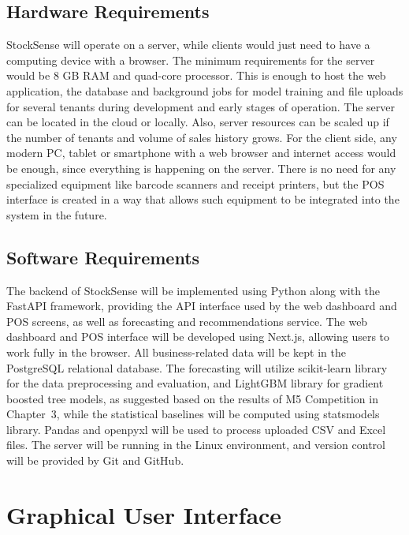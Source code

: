 \documentclass{StockSense}
\begin{document}
\subsection{Hardware Requirements}

StockSense will operate on a server, while clients would just need to have a computing device with a browser. The minimum requirements for the server would be 8 GB RAM and quad-core processor. This is enough to host the web application, the database and background jobs for model training and file uploads for several tenants during development and early stages of operation. The server can be located in the cloud or locally. Also, server resources can be scaled up if the number of tenants and volume of sales history grows. For the client side, any modern PC, tablet or smartphone with a web browser and internet access would be enough, since everything is happening on the server. There is no need for any specialized equipment like barcode scanners and receipt printers, but the POS interface is created in a way that allows such equipment to be integrated into the system in the future.

\subsection{Software Requirements}

The backend of StockSense will be implemented using Python along with the FastAPI framework, providing the API interface used by the web dashboard and POS screens, as well as forecasting and recommendations service. The web dashboard and POS interface will be developed using Next.js, allowing users to work fully in the browser. All business-related data will be kept in the PostgreSQL relational database. The forecasting will utilize scikit-learn library for the data preprocessing and evaluation, and LightGBM library for gradient boosted tree models, as suggested based on the results of M5 Competition in Chapter~3, while the statistical baselines will be computed using statsmodels library. Pandas and openpyxl will be used to process uploaded CSV and Excel files. The server will be running in the Linux environment, and version control will be provided by Git and GitHub.

\section{Graphical User Interface}
\end{document}

